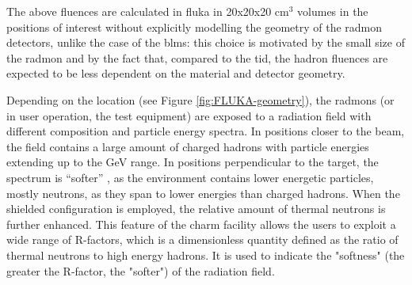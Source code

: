 \documentclass[encoding=utf8,british]{tumphthesis}
\begin{document}
The above fluences are calculated in \acrshort{fluka} in 20x20x20 cm$^3$ volumes in the positions of interest without explicitly modelling the geometry of the \acrshort{radmon} detectors, unlike the case of the \acrshort{blm}s: this choice is motivated by the small size of the \acrshort{radmon} and by the fact that, compared to the \acrshort{tid}, the hadron fluences are expected to be less dependent on the material and detector geometry. 

Depending on the location (see Figure \ref{fig:FLUKA-geometry}), the \acrshort{radmon}s (or in user operation, the test equipment) are exposed to a radiation field with different composition and particle energy spectra. In positions closer to the beam, the field contains a large amount of charged hadrons with particle energies extending up to the GeV range.  In positions perpendicular to the target, the spectrum is “softer” \cite{Alia:2015ium}, as the environment contains lower energetic particles, mostly neutrons, as they span to lower energies than charged hadrons. When the shielded configuration is employed, the relative amount of thermal neutrons is further enhanced. This feature of the \acrshort{charm} facility allows the users to exploit a wide range of R-factors, which is a dimensionless quantity defined as the ratio of thermal neutrons to high energy hadrons. It is used to indicate the "softness" (the greater the R-factor, the "softer") of the radiation field.
\end{document}
